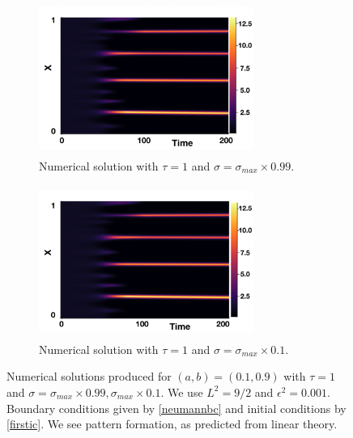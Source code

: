 \begin{figure}[H]
    \centering
    \begin{subfigure}[t]{0.45\textwidth}
        \centering
        \includegraphics[width=7cm,height=5cm]{distp1sig1.png}
        \caption{Numerical solution with $\tau=1$ and $\sigma=\sigma_{max}\times0.99$.}
        \label{}
    \end{subfigure}
    \hfill
    \begin{subfigure}[t]{0.45\textwidth}
        \centering
        \includegraphics[width=7cm,height=5cm]{distp1sig2.png}
        \caption{Numerical solution with $\tau=1$ and $\sigma=\sigma_{max}\times0.1$.}
        \label{}
    \end{subfigure}
    \caption{Numerical solutions produced for $(a,b)=(0.1,0.9)$ with $\tau=1$ and $\sigma=\sigma_{max}\times0.99, \sigma_{max}\times0.1$. We use $L^2=9/2$ and $\epsilon^2=0.001$.
    Boundary conditions given by \eqref{neumannbc} and initial conditions by \eqref{firstic}. We see pattern formation, as predicted from linear theory.}
    \label{fig:testdist1}
\end{figure}

